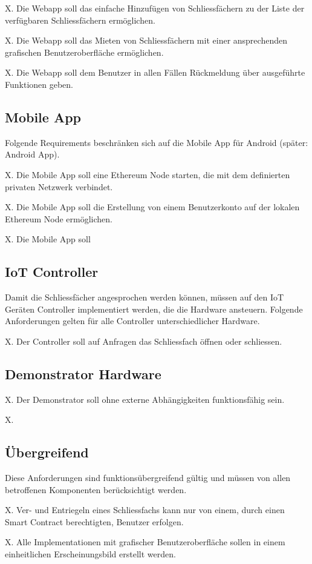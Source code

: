 X. Die Webapp soll das einfache Hinzufügen von Schliessfächern zu der Liste der verfügbaren Schliessfächern ermöglichen.

X. Die Webapp soll das Mieten von Schliessfächern mit einer ansprechenden grafischen Benutzeroberfläche ermöglichen.

X. Die Webapp soll dem Benutzer in allen Fällen Rückmeldung über ausgeführte Funktionen geben.

\subsection{Mobile App}
Folgende Requirements beschränken sich auf die Mobile App für Android (später: Android App).

X. Die Mobile App soll eine Ethereum Node starten, die mit dem definierten privaten Netzwerk verbindet.

X. Die Mobile App soll die Erstellung von einem Benutzerkonto auf der lokalen Ethereum Node ermöglichen.

X. Die Mobile App soll 

\subsection{IoT Controller}
Damit die Schliessfächer angesprochen werden können, müssen auf den IoT Geräten Controller implementiert werden, die die Hardware ansteuern. Folgende Anforderungen gelten für alle Controller unterschiedlicher Hardware.

X. Der Controller soll auf Anfragen das Schliessfach öffnen oder schliessen.

\subsection{Demonstrator Hardware}
X. Der Demonstrator soll ohne externe Abhängigkeiten funktionsfähig sein.

X. 

\subsection{Übergreifend}
Diese Anforderungen sind funktionsübergreifend gültig und müssen von allen betroffenen Komponenten berücksichtigt werden.

X. Ver- und Entriegeln eines Schliessfachs kann nur von einem, durch einen Smart Contract berechtigten, Benutzer erfolgen.

X. Alle Implementationen mit grafischer Benutzeroberfläche sollen in einem einheitlichen Erscheinungsbild erstellt werden.

